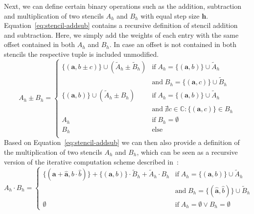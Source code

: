 Next, we can define certain binary operations such as the addition, subtraction and multiplication of two stencils $A_h$ and $B_h$ with equal step size $\bm{h}$.
Equation~\eqref{eq:stencil-addsub} contains a recursive definition of stencil addition and subtraction.
Here, we simply add the weights of each entry with the same offset contained in both $A_h$ and $B_h$.
In case an offset is not contained in both stencils the respective tuple is included unmodified.  
\begin{equation}
	A_h \pm B_h = 
	\begin{cases}
		\{(\bm{a}, b\pm c ) \} \cup (\tilde{A}_h \pm \tilde{B}_h) & \text{if} \; A_h = 	\{(\bm{a}, b ) \} \cup \tilde{A}_h \\
		& \text{and} \; B_h = \{(\bm{a}, c ) \} \cup \tilde{B}_h \\
		
		\{(\bm{a}, b ) \} \cup (\tilde{A}_h \pm B_h) & \text{if} \; A_h = 	\{(\bm{a}, b ) \} \cup \tilde{A}_h \\
		& \text{and} \; \nexists  c \in \mathbb{C} : \{(\bm{a}, c ) \} \in B_h 
		\\
		A_h & \text{if} \; B_h = \emptyset
		\\
		B_h & \text{else} 
		\\
	\end{cases}
\label{eq:stencil-addsub}
\end{equation}
Based on Equation~\eqref{eq:stencil-addsub} we can then also provide a definition of the multiplication of two stencils $A_h$ and $B_h$, which can be seen as a recursive version of the iterative computation scheme described in~\cite{rittich2018extending}:
\begin{equation}
	A_h \cdot B_h = 
	\begin{cases}
		\{(\bm{a} + \bm{\hat{a}}, b \cdot \hat{b} ) \} +  \{(\bm{a}, b ) \} \cdot \tilde{B}_h + \tilde{A}_h \cdot B_h & \text{if} \; A_h = \{(\bm{a}, b ) \} \cup \tilde{A}_h \\
		&
		\text{and} \; B_h = \{(\bm{\hat{a}}, \hat{b} ) \} \cup \tilde{B}_h \\
		\emptyset & \text{if} \; A_h = \emptyset \vee B_h = \emptyset
	\end{cases}
\label{eq:stencil-mult}
\end{equation}

